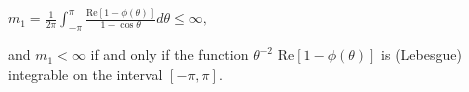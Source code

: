 $m_1 = \frac{1}{2\pi} \int_{-\pi}^{\pi} \frac{\text{Re}[1 - \phi(\theta)]}{1 - \cos \theta} d\theta \leq \infty,$

and $m_1 < \infty$ if and only if the function $\theta^{-2}$ $\text{Re}[1 - \phi(\theta)]$ is (Lebesgue) integrable on the interval $[-\pi, \pi]$.